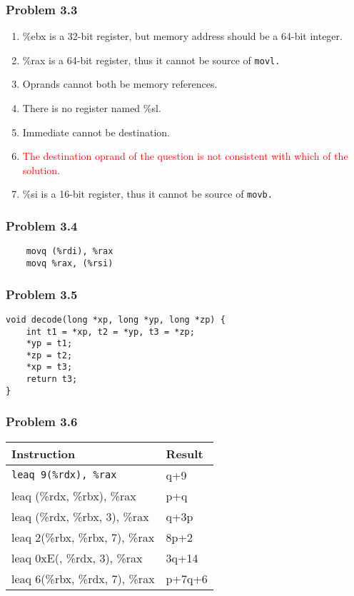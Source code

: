 \documentclass[a4paper]{article}
\begin{document}
\subsubsection*{Problem 3.3}
\begin{enumerate}
    \rm{}
    \item \%ebx is a 32-bit register, but memory address should be a 64-bit integer.
    \item \%rax is a 64-bit register, thus it cannot be source of \tt{movl}\rm{.}
    \item Oprands cannot both be memory references.
    \item There is no register named \%sl.
    \item Immediate cannot be destination.
    \item \textcolor{red}{The destination oprand of the question is not consistent with which of the solution.}
    \item \%si is a 16-bit register, thus it cannot be source of \tt{movb}\rm{.}
\end{enumerate}

\subsubsection*{Problem 3.4}
\begin{lstlisting}
    movq (%rdi), %rax
    movq %rax, (%rsi)
\end{lstlisting}

\subsubsection*{Problem 3.5}
\begin{lstlisting}
void decode(long *xp, long *yp, long *zp) {
    int t1 = *xp, t2 = *yp, t3 = *zp;
    *yp = t1;
    *zp = t2;
    *xp = t3;
    return t3;
}
\end{lstlisting}

\subsubsection*{Problem 3.6}
\begin{tabular}{ll}
    Instruction&Result\\\hline
    \tt{leaq 9(\%rdx), \%rax}&q+9\\
    leaq (\%rdx, \%rbx), \%rax&p+q\\
    leaq (\%rdx, \%rbx, 3), \%rax&q+3p\\
    leaq 2(\%rbx, \%rbx, 7), \%rax&8p+2\\
    leaq 0xE(, \%rdx, 3), \%rax&3q+14\\
    leaq 6(\%rbx, \%rdx, 7), \%rax&p+7q+6
\end{tabular}
\end{document}
